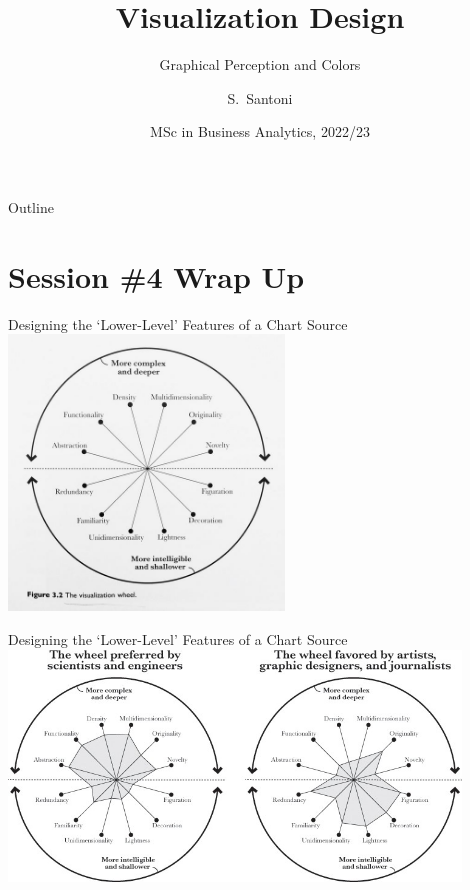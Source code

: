 \documentclass[notes, aspectratio=1610]{beamer}
\title[Visualization Design]%
{Visualization Design}
\subtitle{Graphical Perception and Colors}
\author{S.~Santoni\inst{1}\inst{2}}
\institute{
	\inst{1}%
	Bayes Business School
	\and
	\inst{2}%
	Soundcloud
	}
\date{MSc in Business Analytics, 2022/23}
\begin{document}
\begin{frame}
	\titlepage
\end{frame}

\begin{frame}{Outline}
	\tableofcontents
\end{frame}

\section{Session \#4 Wrap Up}

\begin{frame}{Designing the `Lower-Level' Features of a Chart}
	{Source \cite[][page 61]{cairo2012}}
	\centering 
	\includegraphics[width=0.55\textwidth]{images/viz_wheel.jpeg}
\end{frame}

\begin{frame}{Designing the `Lower-Level' Features of a Chart}
	{Source \cite[][page 63]{cairo2012}}
	\centering 
	\includegraphics[width=0.9\textwidth]{images/viz_whell_comparison.jpeg}
\end{frame}
\end{document}
